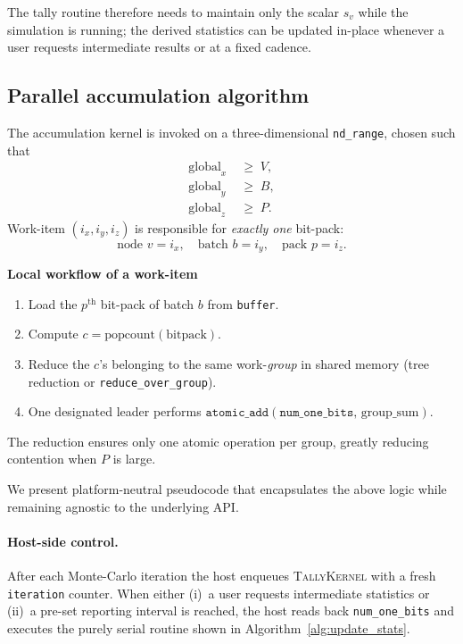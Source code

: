 The tally routine therefore needs to maintain only the scalar
\(s_v\) while the simulation is running; the derived statistics can be updated
in-place whenever a user requests intermediate results or at a fixed cadence.

\subsection{Parallel accumulation algorithm}

The accumulation kernel is invoked on a three-dimensional
\texttt{nd\_range}, chosen such that
\[
  \begin{aligned}
    \text{global}_x &\;\ge\; V,\\
    \text{global}_y &\;\ge\; B,\\
    \text{global}_z &\;\ge\; P.
  \end{aligned}
\]
Work-item \((i_x,i_y,i_z)\) is responsible for \emph{exactly one} bit-pack:
\[
  \text{node  } v=i_x,\quad
  \text{batch } b=i_y,\quad
  \text{pack  } p=i_z.
\]

\vspace{4pt}
\noindent
\textbf{Local workflow of a work-item}
\begin{enumerate}
    \item Load the \(p^{\text{th}}\) bit-pack of batch \(b\) from
          \texttt{buffer}.
    \item Compute \(c=\mathrm{popcount}(\text{bitpack})\).
    \item Reduce the \(c\)’s belonging to the same work-\emph{group} in
          shared memory (tree reduction or \texttt{reduce\_over\_group}).
    \item One designated leader performs
          \(\texttt{atomic\_add}(\texttt{num\_one\_bits},\,\text{group\_sum})\).
\end{enumerate}

The reduction ensures only one atomic operation per group, greatly reducing
contention when \(P\) is large.

We present platform-neutral pseudocode that encapsulates the above logic while remaining agnostic to the underlying API.

\paragraph{Host-side control.}
After each Monte-Carlo iteration the host enqueues \textsc{TallyKernel} with a
fresh \texttt{iteration} counter.  When either (i)~a user requests
intermediate statistics or (ii)~a pre-set reporting interval is reached,
the host reads back \texttt{num\_one\_bits} and executes the purely
serial routine shown in Algorithm~\ref{alg:update_stats}.

